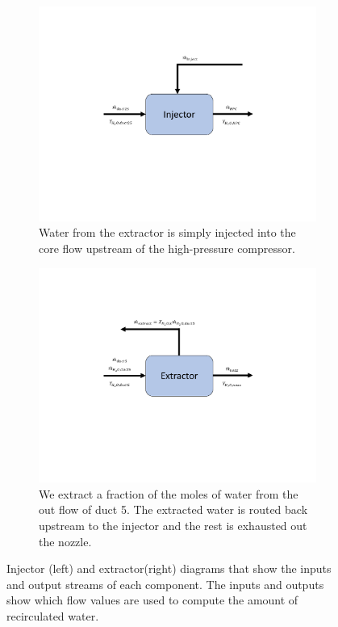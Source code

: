 \documentclass[conf]{new-aiaa}
\begin{document}
\begin{figure}[hbt!]
  \centering
  \begin{subfigure}[t]{0.49\textwidth}
    \includegraphics[width=\textwidth]{injector.pdf}
    \caption{
      Water from the extractor is simply injected into the core flow upstream of the high-pressure compressor.
    }
    \label{fig:injector}
  \end{subfigure}
  \hspace{2pt}
  \begin{subfigure}[t]{0.49\textwidth}
    \includegraphics[width=\textwidth]{extractor.pdf}
    \caption{
      We extract a fraction of the moles of water from the out flow of duct 5.
      The extracted water is routed back upstream to the injector and the rest is exhausted out the nozzle.
    }
    \label{fig:extractor}
  \end{subfigure}
  \caption{Injector (left) and extractor(right) diagrams that show the inputs and output streams of each component.
    The inputs and outputs show which flow values are used to compute the amount of recirculated water.}
  \label{fig:extract_inject}
\end{figure}
\end{document}
